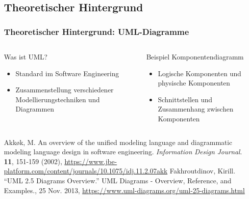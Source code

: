 \documentclass[xcolor=dvipsnames]{beamer}
\begin{document}
	
	
	
	
	\begin{frame}
		\section{Theoretischer Hintergrund}
		\frametitle{Theoretischer Hintergrund: UML-Diagramme}
		\begin{columns}
			\begin{column}{0.50\textwidth}
				\begin{block}{Was ist UML?}
					\begin{itemize}
						\item Standard im Software Engineering
						\item Zusammenstellung verschiedener Modellierungstechniken und Diagrammen
					\end{itemize}
				\end{block}
			\end{column}
			
			\begin{column}{0.50\textwidth}
				\begin{block}{Beispiel Komponentendiagramm}
						\begin{itemize}
							\item Logische Komponenten und physische Komponenten 
							\item Schnittstellen und Zusammenhang zwischen Komponenten
						\end{itemize}
					\begin{minipage}{1.0\textwidth}	
			\end{minipage}
		
				\end{block}
			\end{column}
		\end{columns}
		\begin{thebibliography}{00}
			\tiny
			
			Akkøk, M. An overview of the unified modeling language and diagrammatic modeling language design in software engineering. {\em Information Design Journal}. \textbf{11}, 151-159 (2002), \url{https://www.jbe-platform.com/content/journals/10.1075/idj.11.2.07akk}
			 Fakhroutdinov, Kirill. “UML 2.5 Diagrams Overview.” UML Diagrams - Overview, Reference, and Examples., 25 Nov. 2013, \url{https://www.uml-diagrams.org/uml-25-diagrams.html} 
			

\end{thebibliography}
\end{frame}
\end{document}

